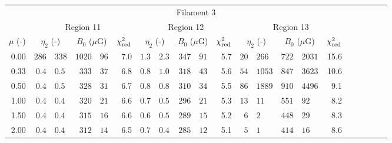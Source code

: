 \begin{tabular}{@{}r r@{ $\pm$ }lr@{ $\pm$ }lr
                     r@{ $\pm$ }lr@{ $\pm$ }lr
                     r@{ $\pm$ }lr@{ $\pm$ }lr
                     r@{ $\pm$ }lr@{ $\pm$ }lr@{}}
\midrule
\multicolumn{21}{c}{Filament 3} \\
\cmidrule{1-21}
{} & \multicolumn{5}{c}{Region 11}
   & \multicolumn{5}{c}{Region 12}
   & \multicolumn{5}{c}{Region 13} \\
\cmidrule(lr){2-6} \cmidrule(lr){7-11} \cmidrule(lr){12-16}
$\mu$ (-) & \multicolumn{2}{c}{$\eta_2$ (-)}
          & \multicolumn{2}{c}{$B_0$ ($\mu$G)} & $\chi^2_{\mathrm{red}}$
          & \multicolumn{2}{c}{$\eta_2$ (-)}
          & \multicolumn{2}{c}{$B_0$ ($\mu$G)} & $\chi^2_{\mathrm{red}}$
          & \multicolumn{2}{c}{$\eta_2$ (-)}
          & \multicolumn{2}{c}{$B_0$ ($\mu$G)} & $\chi^2_{\mathrm{red}}$ \\
\cmidrule{1-16}
0.00 & $286$ & $338$ & $1020$ & $96$ & 7.0
     & $1.3$ & $2.3$ & $347$ & $91$ & 5.7
     & $20$ & $266$ & $722$ & $2031$ & 15.6 \\
0.33 & $0.4$ & $0.5$ & $333$ & $37$ & 6.8
     & $0.8$ & $1.0$ & $318$ & $43$ & 5.6
     & $54$ & $1053$ & $847$ & $3623$ & 10.6 \\
0.50 & $0.4$ & $0.5$ & $328$ & $31$ & 6.7
     & $0.8$ & $0.8$ & $310$ & $34$ & 5.5
     & $86$ & $1889$ & $910$ & $4496$ & 9.1 \\
1.00 & $0.4$ & $0.4$ & $320$ & $21$ & 6.6
     & $0.7$ & $0.5$ & $296$ & $21$ & 5.3
     & $13$ & $11$ & $551$ & $92$ & 8.2 \\
1.50 & $0.4$ & $0.4$ & $315$ & $16$ & 6.6
     & $0.6$ & $0.5$ & $289$ & $15$ & 5.2
     & $6$ & $2$ & $448$ & $29$ & 8.3 \\
2.00 & $0.4$ & $0.4$ & $312$ & $14$ & 6.5
     & $0.7$ & $0.4$ & $285$ & $12$ & 5.1
     & $5$ & $1$ & $414$ & $16$ & 8.6 \\
\bottomrule
\end{tabular}
